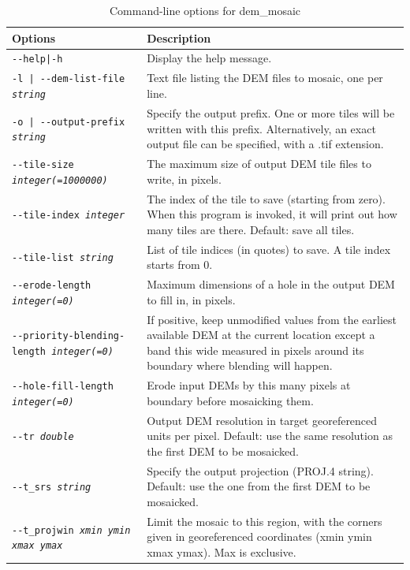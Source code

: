\begin{longtable}{|l|p{10cm}|}
\caption{Command-line options for dem\_mosaic}
\label{tbl:demmosaic}
\endfirsthead
\endhead
\endfoot
\endlastfoot
\hline
Options & Description \\
\hline \hline

\texttt{-\/-help|-h} & Display the help message.\\ \hline
\texttt{-l | -\/-dem-list-file \textit{string}}  &
Text file listing the DEM files to mosaic, one per line.
\\ \hline
\texttt{-o | -\/-output-prefix  \textit{string} } &
Specify the output prefix. One or more tiles will be written with this prefix. Alternatively, an exact output file can be specified, with a .tif extension.
\\ \hline
\texttt{-\/-tile-size \textit{integer(=1000000)}} &
The maximum size of output DEM tile files to write, in pixels.
\\ \hline
\texttt{-\/-tile-index \textit{integer}} &
The index of the tile to save (starting from zero). When this program is invoked, it will print  out how many tiles are there. Default: save all tiles.
\\ \hline

\texttt{-\/-tile-list \textit{string}} &
List of tile indices (in quotes) to save. A tile index starts from 0.
\\ \hline

\texttt{-\/-erode-length \textit{integer(=0)} }  &
Maximum dimensions of a hole in the output DEM to fill in, in pixels.
\\ \hline

\texttt{-\/-priority-blending-length \textit{integer(=0)} }  &
If positive, keep unmodified values from the earliest available DEM at the current location except a band this wide measured in pixels around its boundary where blending will happen.
\\ \hline

\texttt{-\/-hole-fill-length \textit{integer(=0)} }  &
Erode input DEMs by this many pixels at boundary before mosaicking them.
\\ \hline

\texttt{-\/-tr \textit{double}  } &
Output DEM resolution in target georeferenced units per pixel. Default: use the same resolution as the first DEM to be mosaicked.
\\ \hline
\texttt{-\/-t\_srs \textit{string} } &
Specify the output projection (PROJ.4 string). Default: use the one from the first DEM to be mosaicked.
\\ \hline
\texttt{-\/-t\_projwin \textit{xmin ymin xmax ymax} } &
Limit the mosaic to this region, with the corners given in georeferenced coordinates (xmin ymin xmax ymax). Max is exclusive.
\\ \hline


\end{longtable}

